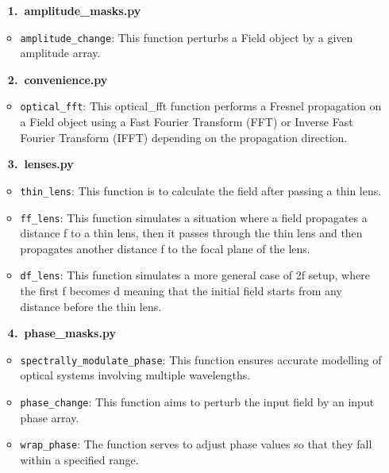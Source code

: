 \documentclass[a4paper,12pt]{report}
\begin{document}
\begin{itemize}[itemsep=1em]
  \item[\large\bfseries 1.\ amplitude\_masks.py]
    \begin{itemize}[itemsep=0.5em]
      \item \texttt{amplitude\_change}: This function perturbs a Field object by a given amplitude array.
    \end{itemize}

  \item[\large\bfseries 2.\ convenience.py]
    \begin{itemize}[itemsep=0.5em]
      \item \texttt{optical\_fft}: This optical\_fft function performs a Fresnel propagation on a Field object using a Fast Fourier Transform (FFT) or Inverse Fast Fourier Transform (IFFT) depending on the propagation direction.
    \end{itemize}

  \item[\large\bfseries 3.\ lenses.py]
    \begin{itemize}[itemsep=0.5em]
      \item \texttt{thin\_lens}: This function is to calculate the field after passing a thin lens.
      \item \texttt{ff\_lens}: This function simulates a situation where a field propagates a distance f to a thin lens, then it passes through the thin lens and then propagates another distance f to the focal plane of the lens.
      \item \texttt{df\_lens}: This function simulates a more general case of 2f setup, where the first f becomes d meaning that the initial field starts from any distance before the thin lens.
    \end{itemize}

  \item[\large\bfseries 4.\ phase\_masks.py]
    \begin{itemize}[itemsep=0.5em]
      \item \texttt{spectrally\_modulate\_phase}: This function ensures accurate modelling of optical systems involving multiple wavelengths.
      \item \texttt{phase\_change}: This function aims to perturb the input field by an input phase array.
      \item \texttt{wrap\_phase}: The function serves to adjust phase values so that they fall within a specified range.
    \end{itemize}


\end{itemize}
\end{document}
